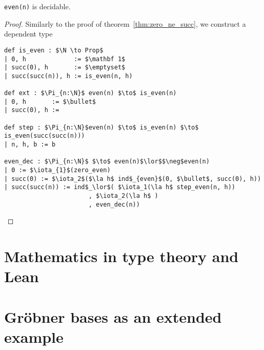 \documentclass[a4paper, 12pt]{article}
\newcommand{\N}{\mathbb{N}}
\newcommand{\la}[1]{\lambda{#1}.\,}
\theoremstyle{changedot}
\theoremstyle{changedotbreak}
\theoremstyle{nonumberplain}
\newtheorem{proof}{Proof}
\begin{document}
\begin{theorem}
  \lstinline{even(n)} is decidable.
\end{theorem}
\begin{proof}
  Similarly to the proof of theorem~\ref{thm:zero_ne_succ}, we construct a dependent type
\begin{lstlisting}
def is_even : $\N \to Prop$
| 0, h             := $\mathbf 1$
| succ(0), h       := $\emptyset$
| succ(succ(n)), h := is_even(n, h)

def ext : $\Pi_{n:\N}$ even(n) $\to$ is_even(n)
| 0, h       := $\bullet$
| succ(0), h := 

def step : $\Pi_{n:\N}$even(n) $\to$ is_even(n) $\to$ is_even(succ(succ(n)))
| n, h, b := b

even_dec : $\Pi_{n:\N}$ $\to$ even(n)$\lor$$\neg$even(n)
| 0 := $\iota_{1}$(zero_even)
| succ(0) := $\iota_2$($\la h$ ind$_{even}$(0, $\bullet$, succ(0), h))
| succ(succ(n)) := ind$_\lor$( $\iota_1(\la h$ step_even(n, h))
                       , $\iota_2(\la h$ )
                       , even_dec(n))
\end{lstlisting}
\end{proof}





\section{Mathematics in type theory and Lean}

\section{Gröbner bases as an extended example}
\end{document}
